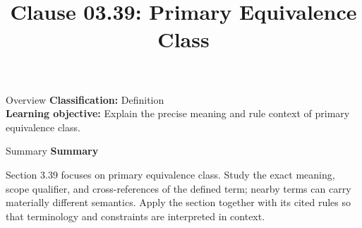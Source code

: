 \documentclass[10pt,letterpaper]{article}
\title{Clause 03.39: Primary Equivalence Class}
\author{}
\date{}
\begin{document}
\maketitle
\begin{CornellOverviewBox}{Overview}
\textbf{Classification:} Definition\\[2pt]
\textbf{Learning objective:} Explain the precise meaning and rule context of primary equivalence class.
\end{CornellOverviewBox}\begin{CornellSummaryBox}{Summary}
{\sffamily\bfseries\color{Accent} Summary}\par\vspace{3pt}Section 3.39 focuses on primary equivalence class. Study the exact meaning, scope qualifier, and cross-references of the defined term; nearby terms can carry materially different semantics. Apply the section together with its cited rules so that terminology and constraints are interpreted in context.
\end{CornellSummaryBox}
\end{document}
